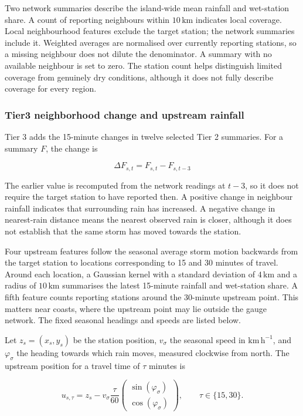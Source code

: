 \documentclass[11pt,a4paper]{article}
\begin{document}
Two network summaries describe the island-wide mean rainfall and wet-station share. A count of reporting neighbours within \(10\,\mathrm{km}\) indicates local coverage. Local neighbourhood features exclude the target station; the network summaries include it. Weighted averages are normalised over currently reporting stations, so a missing neighbour does not dilute the denominator. A summary with no available neighbour is set to zero. The station count helps distinguish limited coverage from genuinely dry conditions, although it does not fully describe coverage for every region.


\subsubsection*{Tier3 neighborhood change and upstream rainfall}
{}


Tier 3 adds the 15-minute changes in twelve selected Tier 2 summaries. For a summary \(F\), the change is


\[
\Delta F_{s,t}=F_{s,t}-F_{s,t-3}
\]


The earlier value is recomputed from the network readings at \(t-3\), so it does not require the target station to have reported then. A positive change in neighbour rainfall indicates that surrounding rain has increased. A negative change in nearest-rain distance means the nearest observed rain is closer, although it does not establish that the same storm has moved towards the station.


Four upstream features follow the seasonal average storm motion backwards from the target station to locations corresponding to 15 and 30 minutes of travel. Around each location, a Gaussian kernel with a standard deviation of \(4\,\mathrm{km}\) and a radius of \(10\,\mathrm{km}\) summarises the latest 15-minute rainfall and wet-station share. A fifth feature counts reporting stations around the 30-minute upstream point. This matters near coasts, where the upstream point may lie outside the gauge network. The fixed seasonal headings and speeds are listed below.


Let \(z_s=(x_s,y_s)\) be the station position, \(v_\sigma\) the seasonal speed in \(\mathrm{km}\,\mathrm{h}^{-1}\), and \(\varphi_\sigma\) the heading towards which rain moves, measured clockwise from north. The upstream position for a travel time of \(\tau\) minutes is


\[
u_{s,\tau}=z_s-v_\sigma\frac{\tau}{60}\begin{pmatrix}\sin(\varphi_\sigma)\\\cos(\varphi_\sigma)\end{pmatrix},\qquad\tau\in\{15,30\}.
\]
\end{document}
